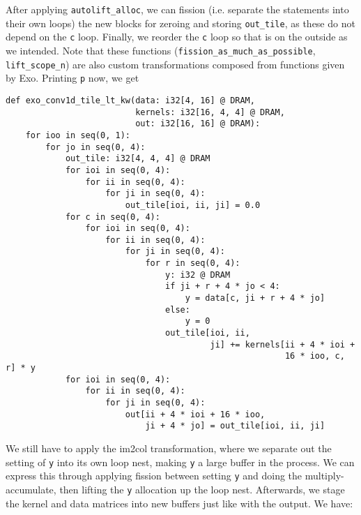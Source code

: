 \documentclass[acmsmall, nonacm=true]{acmart}
\begin{document}
After applying \verb|autolift_alloc|, we can fission (i.e. separate the statements into their own loops) the new blocks for zeroing and storing \verb|out_tile|, as these do not depend on the \verb|c| loop. Finally, we reorder the \verb|c| loop so that is on the outside as we intended. Note that these functions (\verb|fission_as_much_as_possible|, \verb|lift_scope_n|)  are also custom transformations composed from functions given by Exo. Printing \verb|p| now, we get
\begin{verbatim}
def exo_conv1d_tile_lt_kw(data: i32[4, 16] @ DRAM,
                          kernels: i32[16, 4, 4] @ DRAM,
                          out: i32[16, 16] @ DRAM):
    for ioo in seq(0, 1):
        for jo in seq(0, 4):
            out_tile: i32[4, 4, 4] @ DRAM
            for ioi in seq(0, 4):
                for ii in seq(0, 4):
                    for ji in seq(0, 4):
                        out_tile[ioi, ii, ji] = 0.0
            for c in seq(0, 4):
                for ioi in seq(0, 4):
                    for ii in seq(0, 4):
                        for ji in seq(0, 4):
                            for r in seq(0, 4):
                                y: i32 @ DRAM
                                if ji + r + 4 * jo < 4:
                                    y = data[c, ji + r + 4 * jo]
                                else:
                                    y = 0
                                out_tile[ioi, ii,
                                         ji] += kernels[ii + 4 * ioi +
                                                        16 * ioo, c, r] * y
            for ioi in seq(0, 4):
                for ii in seq(0, 4):
                    for ji in seq(0, 4):
                        out[ii + 4 * ioi + 16 * ioo,
                            ji + 4 * jo] = out_tile[ioi, ii, ji]
\end{verbatim}

We still have to apply the im2col transformation, where we separate out the setting of \verb|y| into its own loop nest, making \verb|y| a large buffer in the process. We can express this through applying fission between setting \verb|y| and doing the multiply-accumulate, then lifting the \verb|y| allocation up the loop nest. Afterwards, we stage the kernel and data matrices into new buffers just like with the output. We have:
\end{document}
